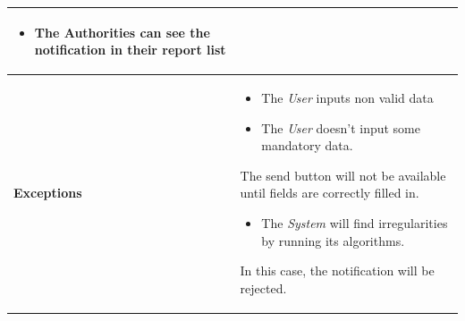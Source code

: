 \begin{table}[H]
\begin{tabular}{|l|p{}|}
\begin{itemize}
 \item The Authorities can see the notification in their report list
 \end{itemize}\\ \hline

\textbf{Exceptions} &    \begin{itemize}
    \item The \textit{User} inputs non valid data
    \item The \textit{User} doesn't input some mandatory data.

\end{itemize}
The send button will not be available until fields are correctly filled in.

\begin{itemize}
    \item The \textit{System} will find irregularities by running its algorithms.
\end{itemize}
In this case, the notification will be rejected.     
                           \\ \hline

\end{tabular}
\end{table}













